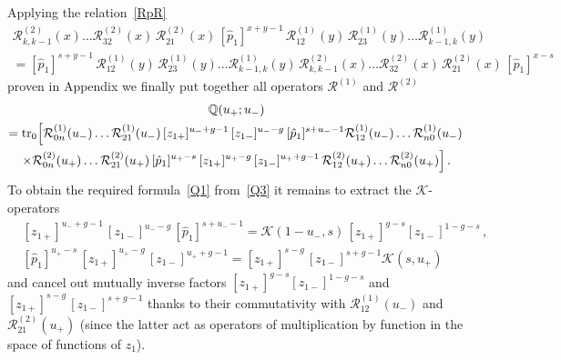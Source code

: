 \documentclass[a4paper,11pt]{article}
\newcommand{\tr}{\mathop{\rm tr}\nolimits}
\numberwithin{equation}{section}
\begin{document}
Applying the relation~\eqref{RpR}
\begin{multline} \nonumber
	\mathcal{R}^{(2)}_{k,k-1}(x)\dots\mathcal{R}^{(2)}_{32}(x)\,\mathcal{R}^{(2)}_{21}(x)\,[\hat{p}_1]^{x+y-1}\,\mathcal{R}^{(1)}_{12}(y)\,\mathcal{R}^{(1)}_{23}(y)\dots
	\mathcal{R}^{(1)}_{k-1,k}(y) \\
	=
	[\hat{p}_1]^{s+y-1}\,\mathcal{R}^{(1)}_{12}(y)\,\mathcal{R}^{(1)}_{23}(y)\dots
	\mathcal{R}^{(1)}_{k-1,k}(y) \,
	\mathcal{R}^{(2)}_{k,k-1}(x)\dots\mathcal{R}^{(2)}_{32}(x)\,\mathcal{R}^{(2)}_{21}(x)\,[\hat{p}_1]^{x-s}
\end{multline}
proven in Appendix we finally put together all operators $\mathcal{R}^{(1)}$ and $\mathcal{R}^{(2)}$
\begin{multline} \label{Q3}
	\mathbb{Q}(u_+;u_-) \\
	= \tr_0\Bigl[ 
	\mathcal{R}^{(1)}_{0n}(u_-)\dots\mathcal{R}^{(1)}_{21}(u_-)\,[z_{1+}]^{u_-+g-1}\,[z_{1-}]^{u_--g} \,
	[\hat{p}_1]^{s+u_--1} \mathcal{R}^{(1)}_{12}(u_-)\dots \mathcal{R}^{(1)}_{n0}(u_-) \, \\
	\times
	\mathcal{R}^{(2)}_{0n}(u_+)\dots\mathcal{R}^{(2)}_{21}(u_+)\,[\hat{p}_1]^{u_+-s} \,
	[z_{1+}]^{u_+-g}\,[z_{1-}]^{u_++g-1}\,\mathcal{R}^{(2)}_{12}(u_+)\dots\mathcal{R}^{(2)}_{n0}(u_+)\Bigr] \,.
\end{multline}
To obtain the required formula~\eqref{Q1} from~\eqref{Q3} it remains to extract the $\mathcal{K}$-operators
\begin{align}
	& \nonumber
	[z_{1+}]^{u_-+g-1}\,[z_{1-}]^{u_--g} \,
	[\hat{p}_1]^{s+u_--1} = \mathcal{K}(1-u_-,s)\,[z_{1+}]^{g-s}[z_{1-}]^{1-g-s} \,, \\
	& \nonumber
	[\hat{p}_1]^{u_+-s} \,
	[z_{1+}]^{u_+-g}\,[z_{1-}]^{u_++g-1} =
	[z_{1+}]^{s-g}\,[z_{1-}]^{s+g-1}\mathcal{K}(s,u_+)
\end{align}
and cancel out mutually inverse factors $[z_{1+}]^{g-s}[z_{1-}]^{1-g-s}$ and $[z_{1+}]^{s-g}\,[z_{1-}]^{s+g-1}$ thanks to their commutativity with $\mathcal{R}^{(1)}_{12}(u_-)$ and $\mathcal{R}^{(2)}_{21}(u_+)$ (since the latter act as operators of multiplication by function in the space of functions of $z_1$).
\end{document}
